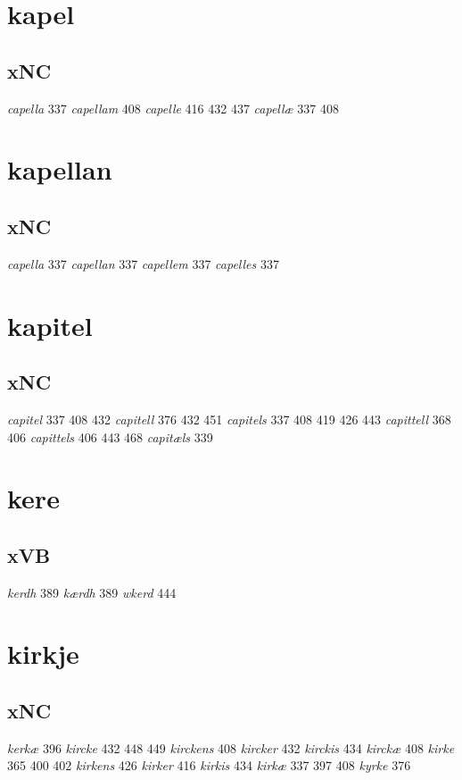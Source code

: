 \documentclass[a4paper,twocolumn]{article}
\begin{document}
\section{kapel}
\label{sec:orgcb41059}
\subsection{xNC}
\label{sec:orga54e8b0}
\emph{capella} 337 \emph{capellam} 408 \emph{capelle} 416 432 437 \emph{capellæ} 337 408 
\section{kapellan}
\label{sec:orgc55ded6}
\subsection{xNC}
\label{sec:org03a6e99}
\emph{capella} 337 \emph{capellan} 337 \emph{capellem} 337 \emph{capelles} 337 
\section{kapitel}
\label{sec:orgb15a576}
\subsection{xNC}
\label{sec:org87e860b}
\emph{capitel} 337 408 432 \emph{capitell} 376 432 451 \emph{capitels} 337 408 419 426 443 \emph{capittell} 368 406 \emph{capittels} 406 443 468 \emph{capitæls} 339 
\section{kere}
\label{sec:org8eaa7ba}
\subsection{xVB}
\label{sec:org466c672}
\emph{kerdh} 389 \emph{kærdh} 389 \emph{wkerd} 444 
\section{kirkje}
\label{sec:orgd76a0d3}
\subsection{xNC}
\label{sec:org8df33fe}
\emph{kerkæ} 396 \emph{kircke} 432 448 449 \emph{kirckens} 408 \emph{kircker} 432 \emph{kirckis} 434 \emph{kirckæ} 408 \emph{kirke} 365 400 402 \emph{kirkens} 426 \emph{kirker} 416 \emph{kirkis} 434 \emph{kirkæ} 337 397 408 \emph{kyrke} 376 
\end{document}
